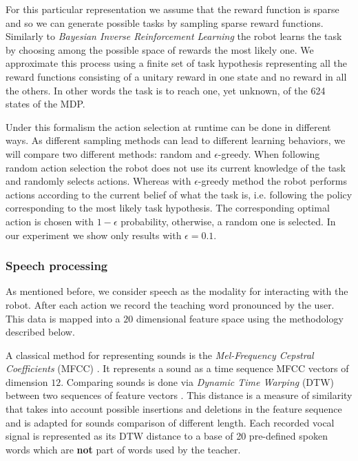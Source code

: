 For this particular representation we assume that the reward function is sparse and so we can generate possible tasks by sampling sparse reward functions. Similarly to \textit{Bayesian Inverse Reinforcement Learning} \cite{Ramachandran07ijcai} the robot learns the task by choosing among the possible space of rewards the most likely one. We approximate this process using a finite set of task hypothesis representing all the reward functions consisting of a unitary reward in one state and no reward in all the others. In other words the task is to reach one, yet unknown, of the 624 states of the MDP.

Under this formalism the action selection at runtime can be done in different ways. As different sampling methods can lead to different learning behaviors, we will compare two different methods: random and  $\epsilon$-greedy. When following random action selection the robot does not use its current knowledge of the task and randomly selects actions. Whereas with $\epsilon$-greedy method the robot performs actions according to the current belief of what the task is, i.e. following the policy corresponding to the most likely task hypothesis. The corresponding optimal action is chosen with $1-\epsilon$ probability, otherwise, a random one is selected. In our experiment we show only results with $\epsilon =  0.1$.
%
%
\subsubsection{Speech processing}
\label{sec:SpeechProcessing}
%
As mentioned before, we consider speech as the modality for interacting with the robot. After each action we record the teaching word pronounced by the user. This data is mapped into a $20$ dimensional feature space using the methodology described below.

A classical method for representing sounds is the \textit{Mel-Frequency Cepstral Coefficients} (MFCC) \cite{zheng2001comparison}. It represents a sound as a time sequence MFCC vectors of dimension $12$. Comparing sounds is done via \textit{Dynamic Time Warping} (DTW) between two sequences of feature vectors \cite{sakoe1978dynamic}. This distance is a measure of similarity that takes into account possible insertions and deletions in the feature sequence and is adapted for sounds comparison of different length. Each recorded vocal signal is represented as its DTW distance to a base of 20 pre-defined spoken words which are \textbf{not} part of words used by the teacher.

